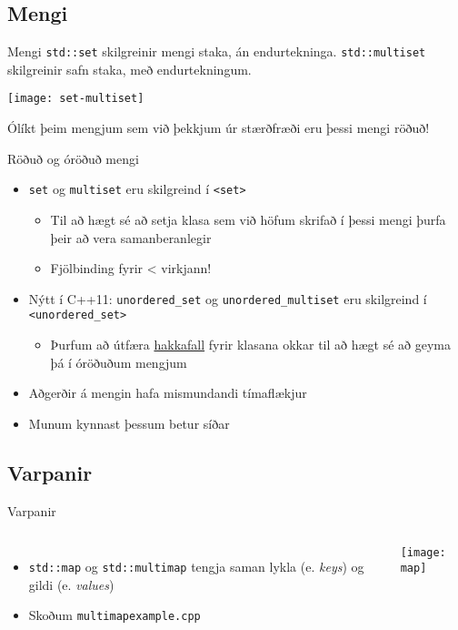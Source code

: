 \subsection{Mengi}

\begin{frame}{Mengi}
\texttt{std::set} skilgreinir mengi staka, án endurtekninga. \texttt{std::multiset} skilgreinir safn staka, með endurtekningum.

\begin{center}
\texttt{[image: set-multiset]}
\end{center}


Ólíkt þeim mengjum sem við þekkjum úr stærðfræði eru þessi mengi röðuð!
\end{frame}

\begin{frame}{Röðuð og óröðuð mengi}
\begin{itemize}
\item \texttt{set} og \texttt{multiset} eru skilgreind í \texttt{<set>}
\begin{itemize}
\item Til að hægt sé að setja klasa sem við höfum skrifað í þessi mengi þurfa þeir að vera samanberanlegir
\item Fjölbinding fyrir < virkjann!
\end{itemize}
\item Nýtt í C++11: \texttt{unordered\_set} og \texttt{unordered\_multiset} eru skilgreind í \texttt{<unordered\_set>}
\begin{itemize}
\item Þurfum að útfæra \href{http://en.cppreference.com/w/cpp/utility/hash}{hakkafall} fyrir klasana okkar til að hægt sé að geyma þá í óröðuðum mengjum
\end{itemize}
\item Aðgerðir á mengin hafa mismundandi tímaflækjur
\item Munum kynnast þessum betur síðar
\end{itemize}
\end{frame}

\subsection{Varpanir}

\begin{frame}{Varpanir}
\begin{columns}
\begin{itemize}
\item \texttt{std::map} og \texttt{std::multimap} tengja saman lykla (e. \emph{keys}) og gildi (e. \emph{values})
\item Skoðum \texttt{multimapexample.cpp}
\end{itemize}
\begin{center}
\texttt{[image: map]}
\end{center}
\end{columns}
\end{frame}